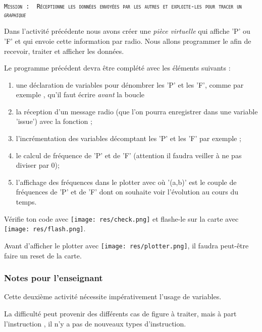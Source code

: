 \begin{eleve}
\texttt{\scshape{Mission : }
Réceptionne les données envoyées par les autres \mb et exploite-les pour tracer un \emph{graphique}}

Dans l'activité précédente nous avons créer une \emph{pièce virtuelle} qui affiche 'P' ou 'F' et qui envoie cette information par radio.
Nous allons programmer le \mb afin de recevoir, traiter et afficher les données. 


Le programme précédent devra être complété avec les éléments suivants :
\begin{enumerate}
    \item une déclaration de variables pour dénombrer les 'P' et les 'F', comme par exemple , qu'il faut écrire \emph{avant} la boucle 
    \item la réception d'un message radio (que l'on pourra enregistrer dans une variable 'issue') avec la fonction  ;
    \item l'incrémentation des variables décomptant les 'P' et les 'F' par exemple  ;
    \item le calcul de fréquence de 'P' et de 'F' (attention il faudra veiller à ne pas diviser par 0);
    \item l'affichage des fréquences dans le plotter avec  où '(a,b)' est le couple de fréquences de 'P' et de 'F' dont on souhaite voir l'évolution au cours du temps.
\end{enumerate}



Vérifie ton code avec   \texttt{[image: res/check.png]} et flashe-le sur la carte avec \texttt{[image: res/flash.png]}.

Avant d'afficher le plotter avec \texttt{[image: res/plotter.png]}, il faudra peut-être faire un reset de la carte.  


\end{eleve}


\newpage
\subsubsection{Notes pour l'enseignant}

Cette deuxième activité nécessite impérativement l'usage de variables.

La difficulté peut provenir des différents cas de figure à traiter, mais à part l'instruction , il n'y a pas de nouveaux types d'instruction.

